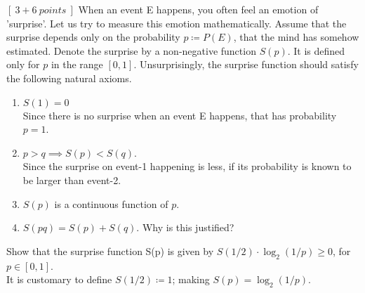 \documentclass[12pt]{article}
\begin{document}
  \begin{question}
    $[\:3+6\:points\:]$ When an event E happens, you often feel an emotion of 'surprise'. Let us try to measure this emotion mathematically. Assume that the surprise depends only on the probability $p \coloneqq P(E)$, that the mind has somehow estimated. Denote the surprise
    by a non-negative function $S(p)$. It is defined only for $p$ in the range
    $[0, 1]$. Unsurprisingly, the surprise function should satisfy the following
    natural axioms.
    \begin{enumerate}
      \item $S(1) = 0$ \label{3.11} \vspace{5pt}\\
      Since there is no surprise when an event E happens, that has
      probability $p = 1$.
      \item $p > q \implies S(p) < S(q)$.\label{3.12} \vspace{5pt}\\
      Since the surprise on event-1 happening is less, if its probability is known to be larger than event-2.
      \item $S(p)$ is a continuous function of $p$. \label{3.13}
      \item $S(pq) = S(p) + S(q)$. Why is this justified? \label{3.14}
    \end{enumerate}
    Show that the surprise function S(p) is given by $S(1/2) \cdot \log_2 (1/p) \geq 0$, for $p \in [0, 1]$.\\
    It is customary to define $S(1/2) \coloneqq 1$; making $S(p) = \log_2 (1/p)$.
  \end{question}
\end{document}
